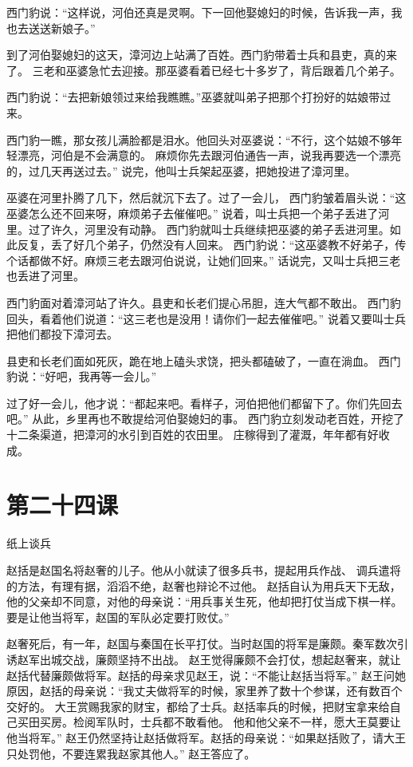 \documentclass[12pt,UTF8]{ctexbook}
\begin{document}
西门豹说：“这样说，河伯还真是灵啊。下一回他娶媳妇的时候，告诉我一声，我也去送送新娘子。”

到了河伯娶媳妇的这天，漳河边上站满了百姓。西门豹带着士兵和县吏，真的来了。
三老和巫婆急忙去迎接。那巫婆看着已经七十多岁了，背后跟着几个弟子。

西门豹说：“去把新娘领过来给我瞧瞧。”巫婆就叫弟子把那个打扮好的姑娘带过来。

西门豹一瞧，那女孩儿满脸都是泪水。他回头对巫婆说：“不行，这个姑娘不够年轻漂亮，河伯是不会满意的。
麻烦你先去跟河伯通告一声，说我再要选一个漂亮的，过几天再送过去。”
说完，他叫士兵架起巫婆，把她投进了漳河里。

巫婆在河里扑腾了几下，然后就沉下去了。过了一会儿，
西门豹皱着眉头说：“这巫婆怎么还不回来呀，麻烦弟子去催催吧。”
说着，叫士兵把一个弟子丢进了河里。过了许久，河里没有动静。
西门豹就叫士兵继续把巫婆的弟子丢进河里。如此反复，丢了好几个弟子，仍然没有人回来。
西门豹说：“这巫婆教不好弟子，传个话都做不好。麻烦三老去跟河伯说说，让她们回来。”
话说完，又叫士兵把三老也丢进了河里。

西门豹面对着漳河站了许久。县吏和长老们提心吊胆，连大气都不敢出。
西门豹回头，看着他们说道：“这三老也是没用！请你们一起去催催吧。”
说着又要叫士兵把他们都投下漳河去。

县吏和长老们面如死灰，跪在地上磕头求饶，把头都磕破了，一直在淌血。
西门豹说：“好吧，我再等一会儿。”

过了好一会儿，他才说：“都起来吧。看样子，河伯把他们都留下了。你们先回去吧。”
从此，乡里再也不敢提给河伯娶媳妇的事。
西门豹立刻发动老百姓，开挖了十二条渠道，把漳河的水引到百姓的农田里。
庄稼得到了灌溉，年年都有好收成。

\section{第二十四课}

纸上谈兵

赵括是赵国名将赵奢的儿子。他从小就读了很多兵书，提起用兵作战、
调兵遣将的方法，有理有据，滔滔不绝，赵奢也辩论不过他。
赵括自认为用兵天下无敌，他的父亲却不同意，对他的母亲说：“用兵事关生死，他却把打仗当成下棋一样。
要是让他当将军，赵国的军队必定要打败仗。”

赵奢死后，有一年，赵国与秦国在长平打仗。当时赵国的将军是廉颇。秦军数次引诱赵军出城交战，廉颇坚持不出战。
赵王觉得廉颇不会打仗，想起赵奢来，就让赵括代替廉颇做将军。赵括的母亲求见赵王，说：“不能让赵括当将军。”
赵王问她原因，赵括的母亲说：“我丈夫做将军的时候，家里养了数十个参谋，还有数百个交好的。
大王赏赐我家的财宝，都给了士兵。赵括率兵的时候，把财宝拿来给自己买田买房。检阅军队时，士兵都不敢看他。
他和他父亲不一样，愿大王莫要让他当将军。”
赵王仍然坚持让赵括做将军。赵括的母亲说：“如果赵括败了，请大王只处罚他，不要连累我赵家其他人。”
赵王答应了。
\end{document}
